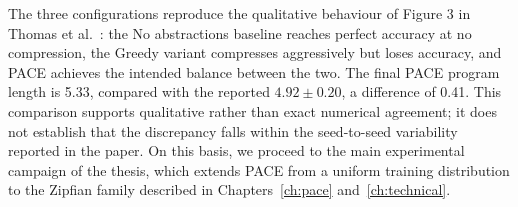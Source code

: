 The three configurations reproduce the qualitative behaviour of Figure 3 in Thomas et al.~\cite{thomas_pace_2025}: the No abstractions baseline reaches perfect accuracy at no compression, the Greedy variant compresses aggressively but loses accuracy, and PACE achieves the intended balance between the two. The final PACE program length is 5.33, compared with the reported $4.92 \pm 0.20$, a difference of 0.41. This comparison supports qualitative rather than exact numerical agreement; it does not establish that the discrepancy falls within the seed-to-seed variability reported in the paper. On this basis, we proceed to the main experimental campaign of the thesis, which extends PACE from a uniform training distribution to the Zipfian family described in Chapters~\ref{ch:pace} and~\ref{ch:technical}.